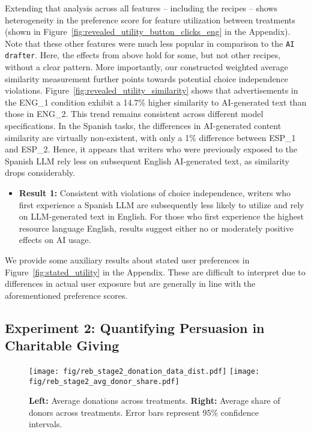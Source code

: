Extending that analysis across all features -- including the recipes -- shows heterogeneity in the preference score for feature utilization between treatments (shown in Figure~\ref{fig:revealed_utility_button_clicks_eng} in the Appendix). Note that these other features were much less popular in comparison to the \texttt{AI drafter}. Here, the effects from above hold for some, but not other recipes, without a clear pattern. More importantly, our constructed weighted average similarity measurement further points towards potential choice independence violations. Figure~\ref{fig:revealed_utility_similarity} shows that advertisements in the ENG\_1 condition exhibit a 14.7\% higher similarity to AI-generated text than those in ENG\_2. This trend remains consistent across different model specifications. In the Spanish tasks, the differences in AI-generated content similarity are virtually non-existent, with only a 1\% difference between ESP\_1 and ESP\_2. Hence, it appears that writers who were previously exposed to the Spanish LLM rely less on subsequent English AI-generated text, as similarity drops considerably.


\begin{itemize}
    \item [] \textbf{Result 1:} Consistent with violations of choice independence, writers who first experience a Spanish LLM are subsequently less likely to utilize and rely on LLM-generated text in English. For those who first experience the highest resource language English, results suggest either no or moderately positive effects on AI usage.
\end{itemize}    


We provide some auxiliary results about stated user preferences in Figure~\ref{fig:stated_utility} in the Appendix. These are difficult to interpret due to differences in actual user exposure but are generally in line with the aforementioned preference scores.


\subsection{Experiment 2: Quantifying Persuasion in Charitable Giving}


\begin{figure}[t!]
    \centering
   

    
    \texttt{[image: fig/reb\_stage2\_donation\_data\_dist.pdf]}
     \texttt{[image: fig/reb\_stage2\_avg\_donor\_share.pdf]}
      
    \caption{\textbf{Left:} Average donations across treatments. \textbf{Right:} Average share of donors across treatments. Error bars represent 95\% confidence intervals.}
    \label{fig:stage2_donation}
\end{figure}

